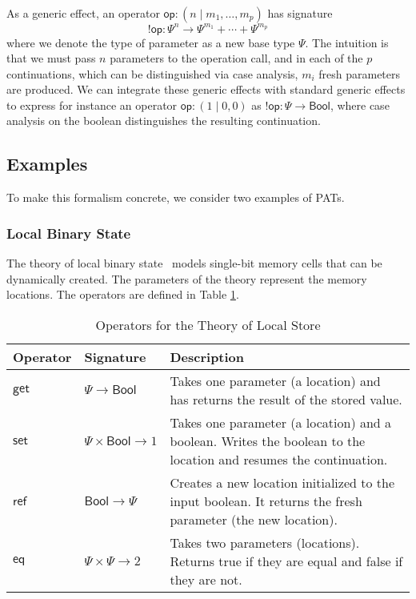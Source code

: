 \documentclass{article}
\theoremstyle{definition}
\theoremstyle{remark}
\newcommand\bool{\mathsf{Bool}}
\newcommand\op{\mathsf{op}}
\newcommand\get{\mathsf{get}}
\newcommand\set{\mathsf{set}}
\newcommand\newref{\mathsf{ref}}
\newcommand\eq{\mathsf{eq}}
\newcommand\eff{{!}}
\begin{document}
As a generic effect, an operator $\op: (n \mid m_1, \dots, m_p)$ has signature
\[
  \eff\op : \Psi^n \to \Psi^{m_1} + \cdots + \Psi^{m_p}
\]
where we denote the type of parameter as a new base type $\Psi$. The intuition is that we must pass $n$ parameters to the operation call, and in each of the $p$ continuations,
which can be distinguished via case analysis, $m_i$ fresh parameters are produced. We can integrate these generic effects with standard generic effects to express for instance
an operator $\op : (1 \mid 0, 0)$ as $\eff\op: \Psi \to \bool$, where case analysis on the boolean distinguishes the resulting continuation.

\subsection{Examples} \label{sec:examples}

To make this formalism concrete, we consider two examples of PATs.

\subsubsection{Local Binary State}

The theory of local binary state~\cite{staton_instances_2013} models single-bit memory cells that can be dynamically created.
The parameters of the theory represent the memory locations. The operators are defined in Table \ref{tab:localstore}.

\begin{table}[h]
  \centering
  \begin{tabular}{l l p{8cm}}
    \hline
    \textbf{Operator} & \textbf{Signature} & \textbf{Description} \\
    \hline
    $\get$    & $\Psi \to \bool$          & Takes one parameter (a location) and has returns the result of the stored value. \\
    $\set$    & $\Psi \times \bool \to 1$ & Takes one parameter (a location) and a boolean. Writes the boolean to the location and resumes the continuation. \\
    $\newref$ & $\bool \to \Psi$          & Creates a new location initialized to the input boolean. It returns the fresh parameter (the new location). \\
    $\eq$     & $\Psi\times \Psi \to 2$   & Takes two parameters (locations). Returns true if they are equal and false if they are not. \\
    \hline
  \end{tabular}
  \caption{Operators for the Theory of Local Store}
  \label{tab:localstore}
\end{table}
\end{document}
